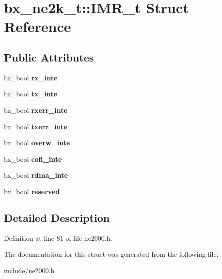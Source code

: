 \hypertarget{structbx__ne2k__t_1_1IMR__t}{\section{bx\-\_\-ne2k\-\_\-t\-:\-:I\-M\-R\-\_\-t Struct Reference}
\label{structbx__ne2k__t_1_1IMR__t}
}
\subsection*{Public Attributes}
\begin{DoxyCompactItemize}
\item 
\hypertarget{structbx__ne2k__t_1_1IMR__t_a892713a6f0ea04fe2410221d5408acee}{bx\-\_\-bool {\bfseries rx\-\_\-inte}}\label{structbx__ne2k__t_1_1IMR__t_a892713a6f0ea04fe2410221d5408acee}

\item 
\hypertarget{structbx__ne2k__t_1_1IMR__t_a2e928648589f614f22b4bd37c1eda559}{bx\-\_\-bool {\bfseries tx\-\_\-inte}}\label{structbx__ne2k__t_1_1IMR__t_a2e928648589f614f22b4bd37c1eda559}

\item 
\hypertarget{structbx__ne2k__t_1_1IMR__t_ad1e11fac8a4bf007db94404d8da3ea3c}{bx\-\_\-bool {\bfseries rxerr\-\_\-inte}}\label{structbx__ne2k__t_1_1IMR__t_ad1e11fac8a4bf007db94404d8da3ea3c}

\item 
\hypertarget{structbx__ne2k__t_1_1IMR__t_abd9b44f7a3432b4a85374f95016b1ccf}{bx\-\_\-bool {\bfseries txerr\-\_\-inte}}\label{structbx__ne2k__t_1_1IMR__t_abd9b44f7a3432b4a85374f95016b1ccf}

\item 
\hypertarget{structbx__ne2k__t_1_1IMR__t_a47521259541f6ac1cfe9cc2f021ad03b}{bx\-\_\-bool {\bfseries overw\-\_\-inte}}\label{structbx__ne2k__t_1_1IMR__t_a47521259541f6ac1cfe9cc2f021ad03b}

\item 
\hypertarget{structbx__ne2k__t_1_1IMR__t_a7869be2cbd85da2247412090d8cc50b3}{bx\-\_\-bool {\bfseries cofl\-\_\-inte}}\label{structbx__ne2k__t_1_1IMR__t_a7869be2cbd85da2247412090d8cc50b3}

\item 
\hypertarget{structbx__ne2k__t_1_1IMR__t_acd250cdfad7020863c7d495640be11c8}{bx\-\_\-bool {\bfseries rdma\-\_\-inte}}\label{structbx__ne2k__t_1_1IMR__t_acd250cdfad7020863c7d495640be11c8}

\item 
\hypertarget{structbx__ne2k__t_1_1IMR__t_ab4911bd32a7449d0079712b0d1533bf6}{bx\-\_\-bool {\bfseries reserved}}\label{structbx__ne2k__t_1_1IMR__t_ab4911bd32a7449d0079712b0d1533bf6}

\end{DoxyCompactItemize}


\subsection{Detailed Description}


Definition at line 81 of file ne2000.\-h.



The documentation for this struct was generated from the following file\-:\begin{DoxyCompactItemize}
\item 
include/ne2000.\-h\end{DoxyCompactItemize}
